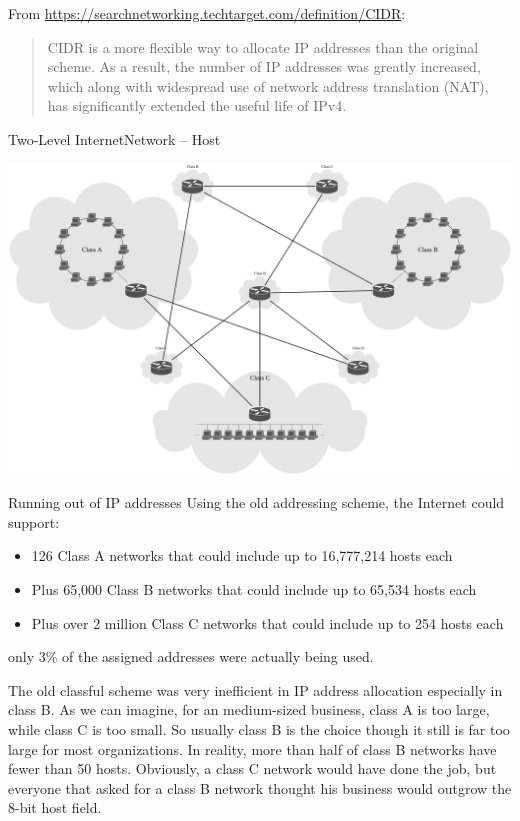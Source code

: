 From \url{https://searchnetworking.techtarget.com/definition/CIDR}:
\begin{quote}
  CIDR is a more flexible way to allocate IP addresses than the original scheme. As a
  result, the number of IP addresses was greatly increased, which along with widespread
  use of network address translation (NAT), has significantly extended the useful life of
  IPv4.
\end{quote}

\begin{frame}{Two-Level Internet}{Network -- Host}
\begin{center}
  \includegraphics[width=\textwidth]{2-level-internet}
\end{center}
\end{frame}

\begin{frame}{Running out of IP addresses}
  Using the old addressing scheme, the Internet could support:
  \begin{itemize}
  \item 126 Class A networks that could include up to 16,777,214 hosts each
  \item Plus 65,000 Class B networks that could include up to 65,534 hosts each
  \item Plus over 2 million Class C networks that could include up to 254 hosts each
  \end{itemize}
  only 3\% of the assigned addresses were actually being used.
\end{frame}

The old classful scheme was very inefficient in IP address allocation especially in class
B. As we can imagine, for an medium-sized business, class A is too large, while class C is
too small. So usually class B is the choice though it still is far too large for most
organizations. In reality, more than half of class B networks have fewer than 50
hosts. Obviously, a class C network would have done the job, but everyone that asked for a
class B network thought his business would outgrow the 8-bit host field.


